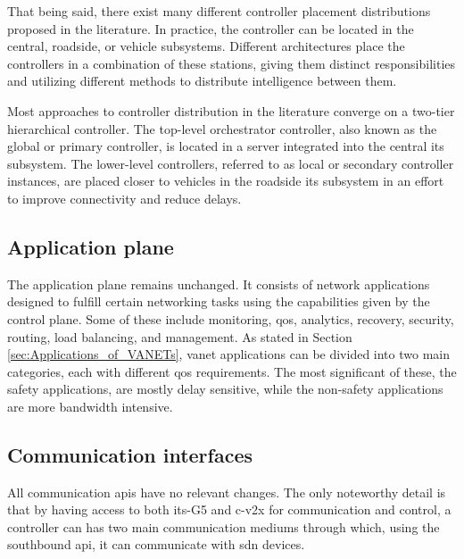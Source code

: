 That being said, there exist many different controller placement distributions proposed in the literature. In practice, the controller can be located in the central, roadside, or vehicle subsystems. Different architectures place the controllers in a combination of these stations, giving them distinct responsibilities and utilizing different methods to distribute intelligence between them.

Most approaches to controller distribution in the literature\cite{bhatia_software_2019}\cite{cardona_software-defined_2020}\cite{toufga_openflow_2018} converge on a two-tier hierarchical controller. The top-level orchestrator controller, also known as the global or primary controller, is located in a server integrated into the central \gls{its} subsystem. The lower-level controllers, referred to as local or secondary controller instances, are placed closer to vehicles in the roadside \gls{its} subsystem in an effort to improve connectivity and reduce delays. 

\subsection{Application plane}

The application plane remains unchanged. It consists of network applications designed to fulfill certain networking tasks using the capabilities given by the control plane. Some of these include monitoring, \gls{qos}, analytics, recovery, security, routing, load balancing, and management\cite{bhatia_software_2019}. As stated in Section \ref{sec:Applications_of_VANETs}, \gls{vanet} applications can be divided into two main categories, each with different \gls{qos} requirements. The most significant of these, the safety applications, are mostly delay sensitive, while the non-safety applications are more bandwidth intensive\cite{smida_efficient_2020}. 


\subsection{Communication interfaces}

All communication \glspl{api} have no relevant changes. The only noteworthy detail is that  by having access to both \gls{its}-G5 and \gls{c-v2x} for communication and control\cite{toufga_openflow_2018}, a controller can has two main communication mediums through which, using the southbound \gls{api}, it can communicate with \gls{sdn} devices. 





